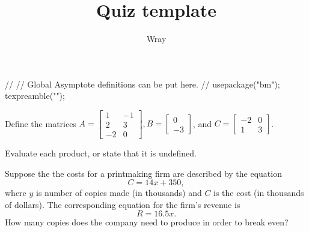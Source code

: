 \documentclass[addpoints, 12pt]{exam}
\title{Quiz template}
\author{Wray}
\begin{document}
\begin{asydef}
//
// Global Asymptote definitions can be put here.
//
usepackage("bm");
texpreamble("\def\V#1{\bm{#1}}");
\end{asydef}



\bigskip

             
\bigskip
\bigskip

\smallskip

\begin{questions}

\question[10]
Define the matrices 
$A = \left[ \begin{array} {cc}
1 & -1 \\
2 & 3 \\
-2 & 0
\end{array} \right], 
B = \left[ \begin{array} {cc}
0 \\
-3
\end{array} \right]$, and
$C = \left[ \begin{array} {cc}
-2 & 0 \\
1 & 3
\end{array} \right]$.

Evaluate each product, or state that it is undefined.
\newpage

\question[10]
Suppose the the costs for a printmaking firm are described by the equation
\begin{equation*}
C = 14x + 350,
\end{equation*}
where $y$ is number of copies made (in thousands) and $C$ is the cost (in thousands of dollars).  The corresponding equation for the firm's revenue is
\begin{equation*}
R = 16.5x.
\end{equation*}
How many copies does the company need to produce in order to break even?

\end{questions}
\end{document}
